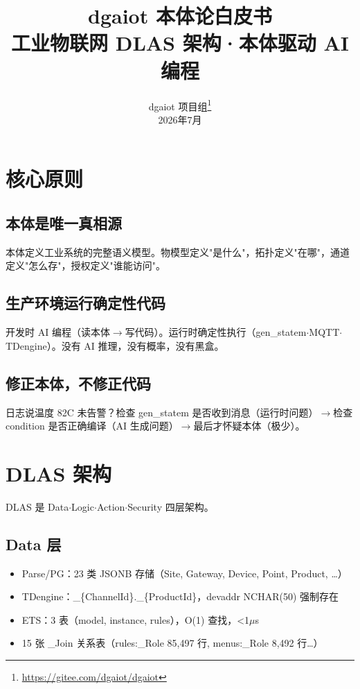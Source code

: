 \documentclass[12pt,a4paper]{ctexart}
\title{{\Huge\heiti dgaiot 本体论白皮书}\\[4pt]{\Large 工业物联网 DLAS 架构·本体驱动 AI 编程}}
\author{dgaiot 项目组\thanks{\url{https://gitee.com/dgaiot/dgaiot}}\\\small 2026年7月}
\date{}
\begin{document}
\maketitle\thispagestyle{empty}
\newpage\tableofcontents\newpage

\section{核心原则}

\subsection{本体是唯一真相源}
本体定义工业系统的完整语义模型。物模型定义"是什么"，拓扑定义"在哪"，通道定义"怎么存"，授权定义"谁能访问"。

\subsection{生产环境运行确定性代码}
开发时 AI 编程（读本体$\rightarrow$写代码）。运行时确定性执行（gen\_statem$\cdot$MQTT$\cdot$TDengine）。没有 AI 推理，没有概率，没有黑盒。

\subsection{修正本体，不修正代码}
日志说温度 82\textdegree C 未告警？检查 gen\_statem 是否收到消息（运行时问题）$\rightarrow$检查 condition 是否正确编译（AI 生成问题）$\rightarrow$最后才怀疑本体（极少）。

\section{DLAS 架构}

DLAS 是 Data$\cdot$Logic$\cdot$Action$\cdot$Security 四层架构。

\subsection{Data 层}

\begin{itemize}[leftmargin=*]
  \item Parse/PG：23 类 JSONB 存储（Site, Gateway, Device, Point, Product, \ldots）
  \item TDengine：\_\{ChannelId\}.\_\{ProductId\}，devaddr NCHAR(50) 强制存在
  \item ETS：3 表（model, instance, rules），O(1) 查找，<1$\mu$s
  \item 15 张 \_Join 关系表（rules:\_Role 85,497 行, menus:\_Role 8,492 行\ldots）
\end{itemize}
\end{document}
